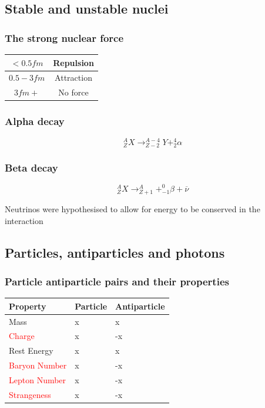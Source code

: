 \documentclass[12pt]{article}
\begin{document}
\subsection{Stable and unstable nuclei}
\subsubsection{The strong nuclear force}
\begin{tabular}{|c|c|}
\hline
$<0.5fm$&Repulsion\\
\hline
$0.5-3fm$&Attraction\\
\hline
$3fm+$&No force\\
\hline
\end{tabular}
\subsubsection{Alpha decay}
{\large
$$^A_ZX\rightarrow ^{A-4}_{Z-2}Y+^4_2\alpha$$
\subsubsection{Beta decay}
$$^A_ZX\rightarrow ^A_{Z+1}+^0_{-1}\beta+\overline{\nu}$$}
Neutrinos were hypothesised to allow for energy to be conserved in the interaction
\subsection{Particles, antiparticles and photons}
\subsubsection{Particle antiparticle pairs and their properties}
{\def\arraystretch{1.5}
\begin{tabularx}{\textwidth}{|X|X|X|}
\hline
\textbf{Property}&\textbf{Particle}&\textbf{Antiparticle}\\
\hline
Mass&x&x\\
\hline
\textcolor{red}{Charge}&x&-x\\
\hline
Rest Energy&x&x\\
\hline
\textcolor{red}{Baryon Number}&x&-x\\
\hline
\textcolor{red}{Lepton Number}&x&-x\\
\hline
\textcolor{red}{Strangeness}&x&-x\\
\hline
\end{tabularx}}
\newpage
\end{document}
